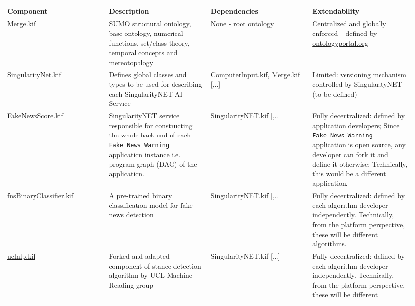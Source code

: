\documentclass[]{report}
\begin{document}
\begin{table}[H]
  \scriptsize
  \centering
  \begin{tabular}{p{0.24\linewidth}|p{0.24\linewidth}|p{0.24\linewidth}|p{0.24\linewidth}|}
    \textbf{Component} &
    \textbf{Description} &
    \textbf{Dependencies} &
    \textbf{Extendability}\\
    \hline
    \href{https://github.com/ontologyportal/sumo/blob/master/Merge.kif}{Merge.kif} &
    SUMO structural ontology, base ontology, numerical functions, set/class theory, temporal concepts and mereotopology &
    None - root ontology &
    Centralized and globally enforced -- defined by \href{http://www.ontologyportal.org/}{ontologyportal.org} \\
    \hline
    \href{https://github.com/singnet/ai-dsl/blob/master/ontology/
    SingulairtyNet.kif}{SingularityNet.kif} &
    Defines global classes and types to be used for describing each
    SingularityNET AI Service &
    ComputerInput.kif, Merge.kif [,..]&
    Limited: versioning mechanism controlled by SingularityNET (to be defined)\\
    \hline
    \href{https://github.com/singnet/ai-dsl/blob/master/ontology/
    FakeNewsScore.kif}{FakeNewsScore.kif} &
    SingularityNET service responsible for constructing the whole back-end of
    each \texttt{Fake News Warning} application instance i.e. program graph
    (DAG) of the application.&
    SingularityNET.kif [,..] &
    Fully decentralized: defined by application developers; Since \texttt{Fake News
Warning} application is open source, any developer can fork it and define it
otherwise; Technically, this would be a different application.\\
    \hline
    \href{https://github.com/singnet/ai-dsl/blob/master/ontology/fnsBinaryClassifier.kif}{fnsBinaryClassifier.kif} &
    A pre-trained binary classification model for fake news detection &
    SingularityNET.kif [,..] &
    Fully decentralized: defined by each algorithm developer independently.
    Technically, from the platform perspective, these will be different
    algorithms. \\
    \hline
    \href{https://github.com/singnet/ai-dsl/blob/master/ontology/
    uclnlp.kif}{uclnlp.kif} &
    Forked and adapted component of stance detection algorithm by UCL Machine Reading group &
    SingularityNET.kif [,..] &
    Fully decentralized: defined by each algorithm developer independently.
    Technically, from the platform perspective, these will be different

\end{tabular}
\end{table}
\end{document}
